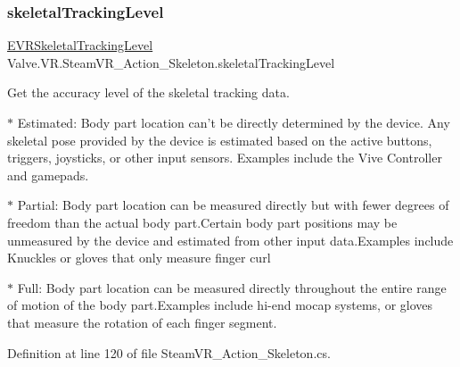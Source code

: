\mbox{\label{class_valve_1_1_v_r_1_1_steam_v_r___action___skeleton_aa9ab0a739929c7ac378974d7f9a71c91}} 
\subsubsection{\texorpdfstring{skeletalTrackingLevel}{skeletalTrackingLevel}}
{\footnotesize\ttfamily \mbox{\hyperlink{namespace_valve_1_1_v_r_a6f46bd50fb65255d6537ab32a6bddc30}{E\+V\+R\+Skeletal\+Tracking\+Level}} Valve.\+V\+R.\+Steam\+V\+R\+\_\+\+Action\+\_\+\+Skeleton.\+skeletal\+Tracking\+Level\hspace{0.3cm}{\ttfamily [get]}}



Get the accuracy level of the skeletal tracking data. 

$\ast$ Estimated\+: Body part location can’t be directly determined by the device. Any skeletal pose provided by the device is estimated based on the active buttons, triggers, joysticks, or other input sensors. Examples include the Vive Controller and gamepads. 

$\ast$ Partial\+: Body part location can be measured directly but with fewer degrees of freedom than the actual body part.\+Certain body part positions may be unmeasured by the device and estimated from other input data.\+Examples include Knuckles or gloves that only measure finger curl 

$\ast$ Full\+: Body part location can be measured directly throughout the entire range of motion of the body part.\+Examples include hi-\/end mocap systems, or gloves that measure the rotation of each finger segment. 



Definition at line 120 of file Steam\+V\+R\+\_\+\+Action\+\_\+\+Skeleton.\+cs.

\mbox{\label{class_valve_1_1_v_r_1_1_steam_v_r___action___skeleton_a11e85fa5ab977aa3a4c4e7e1b6d01c8e}} 
